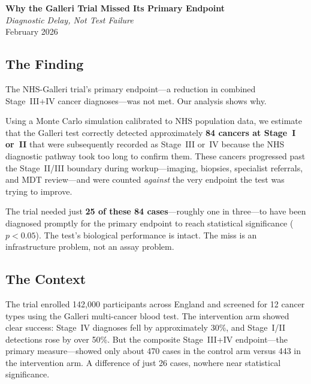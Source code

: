 \documentclass[11pt,a4paper]{article}
\begin{document}
\begin{center}
{\Large\bfseries Why the Galleri Trial Missed Its Primary Endpoint}\\[0.3em]
{\large\itshape Diagnostic Delay, Not Test Failure}\\[0.5em]
{\normalsize February 2026}
\end{center}

\subsection*{The Finding}

The NHS-Galleri trial's primary endpoint---a reduction in combined
Stage~III+IV cancer diagnoses---was not met. Our analysis shows why.

Using a Monte Carlo simulation calibrated to NHS population data, we
estimate that the Galleri test correctly detected approximately
\textbf{84 cancers at Stage~I or~II} that were subsequently recorded
as Stage~III or~IV because the NHS diagnostic pathway took too long
to confirm them. These cancers progressed past the Stage~II/III
boundary during workup---imaging, biopsies, specialist referrals,
and MDT review---and were counted \emph{against} the very endpoint
the test was trying to improve.

\begin{tcolorbox}[colback=blue!3!white, colframe=blue!50!black,
  boxrule=0.5pt, arc=2pt, left=6pt, right=6pt, top=4pt, bottom=4pt]
The trial needed just \textbf{25 of these 84 cases}---roughly one in
three---to have been diagnosed promptly for the primary endpoint to
reach statistical significance ($p < 0.05$). The test's biological
performance is intact. The miss is an infrastructure problem, not an
assay problem.
\end{tcolorbox}

\subsection*{The Context}

The trial enrolled 142{,}000 participants across England and screened
for 12 cancer types using the Galleri multi-cancer blood test. The
intervention arm showed clear success: Stage~IV diagnoses fell by
approximately 30\%, and Stage~I/II detections rose by over 50\%. But
the composite Stage~III+IV endpoint---the primary measure---showed
only about 470 cases in the control arm versus 443 in the
intervention arm. A difference of just 26 cases, nowhere near
statistical significance.
\end{document}
